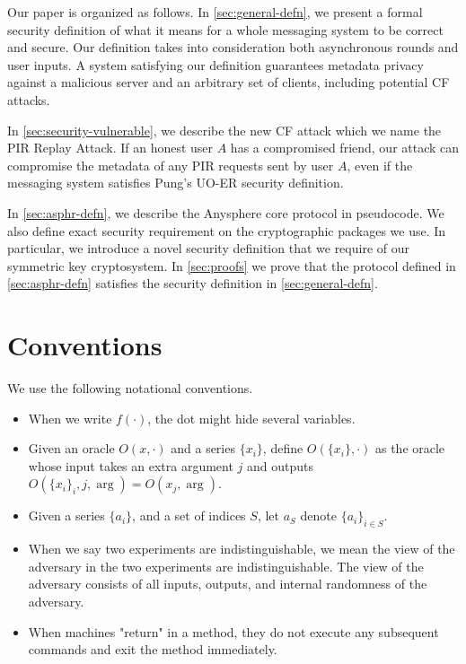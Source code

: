 Our paper is organized as follows. In \cref{sec:general-defn}, we present a formal security definition of what it means for a whole messaging system to be correct and secure. Our definition takes into consideration both asynchronous rounds and user inputs. A system satisfying our definition guarantees metadata privacy against a malicious server and an arbitrary set of clients, including potential CF attacks.

In \cref{sec:security-vulnerable}, we describe the new CF attack which we name the PIR Replay Attack. If an honest user $A$ has a compromised friend, our attack can compromise the metadata of any PIR requests sent by user $A$, even if the messaging system satisfies Pung's UO-ER security definition. 

In \cref{sec:asphr-defn}, we describe the Anysphere core protocol in pseudocode. We also define exact security requirement on the cryptographic packages we use. In particular, we introduce a novel security definition that we require of our symmetric key cryptosystem. In \cref{sec:proofs} we prove that the protocol defined in \cref{sec:asphr-defn} satisfies the security definition in \cref{sec:general-defn}.



\section{Conventions}
We use the following notational conventions.
\begin{itemize}
    \item When we write $f(\cdot)$, the dot might hide several variables.
    
    \item Given an oracle $O(x, \cdot)$ and a series $\{x_i\}$, define $O(\{x_i\}, \cdot)$ as the oracle whose input takes an extra argument $j$ and outputs $O(\{x_i\}_i, j, \arg) = O(x_j, \arg)$.

    \item Given a series $\{a_i\}$, and a set of indices $S$, let $a_S$ denote $\{a_i\}_{i \in S}$. 

    \item When we say two experiments are indistinguishable, we mean the view of the adversary in the two experiments are indistinguishable. The view of the adversary consists of all inputs, outputs, and internal randomness of the adversary.
    
    \item When machines "return" in a method, they do not execute any subsequent commands and exit the method immediately.
\end{itemize}
